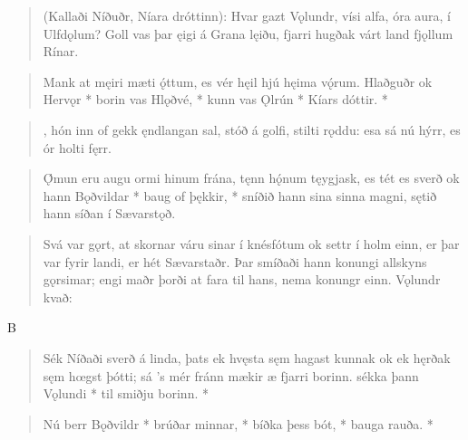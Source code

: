 
\begin{verse}
\bva (Kallaði Níðuðr,
Níara dróttinn):
Hvar gazt Vǫlundr,
vísi alfa,
óra aura,
í Ulfdǫlum?
Goll vas þar ęigi
á Grana lęiðu,
fjarri hugðak várt land
fjǫllum Rínar.\\%
\end{verse}


\begin{verse}
\bva Mank at męiri
mæti ǫ́ttum,
es vér hęil hjú
hęima vǫ́rum.
Hlaðguðr ok Hervǫr *
borin vas Hlǫðvé, *
kunn vas Ǫlrún *
Kíars dóttir. *\\%
\end{verse}


\begin{verse}
,
hón inn of gekk
ęndlangan sal,
stóð á golfi,
stilti rǫddu:
esa sá nú hýrr,
es ór holti fęrr.\\%
\end{verse}


\begin{verse}
\bva Ǫ́mun eru augu
ormi hinum frána,
tęnn hǫ́num tęygjask,
es tét es sverð
ok hann Bǫðvildar *
baug of þękkir, *
sníðið hann sina
sinna magni,
sętið hann síðan
í Sævarstǫð.\\%
\end{verse}


\begin{verse}
\bva Svá var gǫrt, at skornar váru sinar í knésfótum ok settr í holm einn, er þar var fyrir landi, er hét Sævarstaðr. Þar smíðaði hann konungi allskyns gǫrsimar; engi maðr þorði at fara til hans, nema konungr einn. Vǫlundr kvað:\\%
\end{verse}

\bvb B

\begin{verse}
\bva Sék Níðaði
sverð á linda,
þats ek hvęsta
sęm hagast kunnak
ok ek hęrðak
sęm hœgst þótti;
sá ’s mér fránn mækir
æ fjarri borinn.
sékka þann Vǫlundi *
til smiðju borinn. *\\%
\end{verse}


\begin{verse}
\bva Nú berr Bǫðvildr *
brúðar minnar, *
bíðka þess bót, *
bauga rauða. *\\%
\end{verse}

